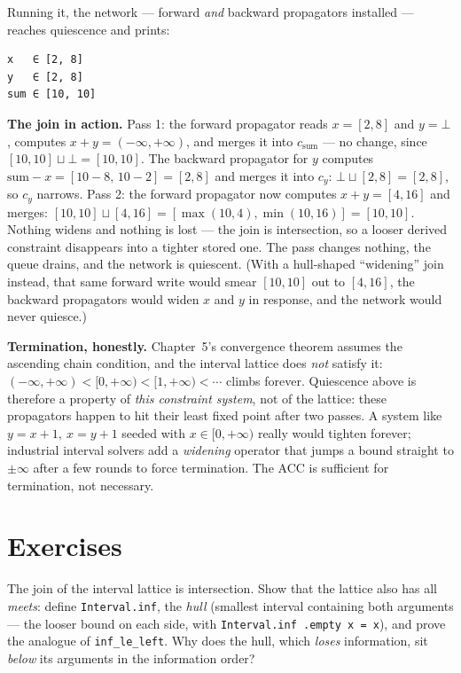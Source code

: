 \documentclass[12pt, a4paper, openright]{book}
\theoremstyle{thmstyle}
\theoremstyle{defstyle}
\newcommand{\lc}[1]{\texttt{#1}}
\newenvironment{notebox}{%
  \begin{tcolorbox}[notebox]%
}{\end{tcolorbox}}
\newcounter{exercise}[chapter]
\newenvironment{exercisebox}[1][]{%
  \refstepcounter{exercise}%
  \begin{tcolorbox}[exercisebox,
    title={Exercise \thechapter.\theexercise\ifx\\#1\\\else\ --- #1\fi}]%
}{\end{tcolorbox}}
\begin{document}
Running it, the network --- forward \emph{and} backward propagators
installed --- reaches quiescence and prints:

\begin{verbatim}
x   ∈ [2, 8]
y   ∈ [2, 8]
sum ∈ [10, 10]
\end{verbatim}

\begin{notebox}
  \textbf{The join in action.}
  Pass 1: the forward propagator reads $x = [2,8]$ and $y = \bot$, computes
  $x + y = (-\infty, +\infty)$, and merges it into $c_\text{sum}$ --- no
  change, since $[10,10] \sqcup \bot = [10,10]$. The backward propagator
  for $y$ computes $\mathrm{sum} - x = [10-8,\, 10-2] = [2,8]$ and merges
  it into $c_y$: $\bot \sqcup [2,8] = [2,8]$, so $c_y$ narrows.
  Pass 2: the forward propagator now computes $x + y = [4,16]$ and merges:
  $[10,10] \sqcup [4,16] = [\max(10,4), \min(10,16)] = [10,10]$. Nothing
  widens and nothing is lost --- the join is intersection, so a looser
  derived constraint disappears into a tighter stored one. The pass
  changes nothing, the queue drains, and the network is quiescent. (With a
  hull-shaped ``widening'' join instead, that same forward write would
  smear $[10,10]$ out to $[4,16]$, the backward propagators would widen
  $x$ and $y$ in response, and the network would never quiesce.)
\end{notebox}

\begin{notebox}
  \textbf{Termination, honestly.}
  Chapter~5's convergence theorem assumes the ascending chain condition,
  and the interval lattice does \emph{not} satisfy it:
  $(-\infty,+\infty) < [0,+\infty) < [1,+\infty) < \cdots$ climbs forever.
  Quiescence above is therefore a property of \emph{this constraint
  system}, not of the lattice: these propagators happen to hit their least
  fixed point after two passes. A system like $y = x + 1,\ x = y + 1$
  seeded with $x \in [0,+\infty)$ really would tighten forever; industrial
  interval solvers add a \emph{widening} operator that jumps a bound
  straight to $\pm\infty$ after a few rounds to force termination. The ACC
  is sufficient for termination, not necessary.
\end{notebox}

\section{Exercises}

\begin{exercisebox}[The hull is the meet]
  The join of the interval lattice is intersection. Show that the lattice
  also has all \emph{meets}: define \lc{Interval.inf}, the \emph{hull}
  (smallest interval containing both arguments --- the looser bound on each
  side, with \lc{Interval.inf .empty x = x}), and prove the analogue of
  \lc{inf\_le\_left}. Why does the hull, which \emph{loses} information,
  sit \emph{below} its arguments in the information order?
\end{exercisebox}
\end{document}
